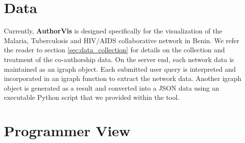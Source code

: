 \section{Data}
Currently, \textbf{AuthorVis} is designed specifically for the visualization of the Malaria, Tuberculosis and HIV/AIDS collaborative network in Benin. We refer the reader to section \ref{sec:data_collection} for details on the collection and treatment of the co-authorship data. On the server end, each network data is maintained as an igraph object. Each submitted user query is interpreted and incorporated in an igraph function to extract the network data. Another igraph object is generated as a result and converted into a JSON data using an executable Python script that we provided within the tool.

\section{Programmer View}
